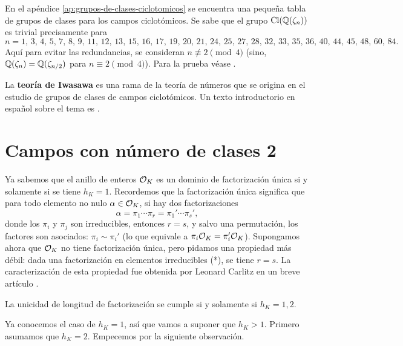 En el apéndice \ref{ap:grupos-de-clases-ciclotomicos} se encuentra una pequeña
tabla de grupos de clases para los campos ciclotómicos. Se sabe que el grupo
$\operatorname{Cl} (\mathbb{Q} (\zeta_n))$ es trivial precisamente para
$$n = 1, \, 3, \, 4, \, 5, \, 7, \, 8, \, 9, \, 11, \, 12, \, 13, \, 15, \, 16, \, 17, \, 19, \, 20, \, 21, \, 24, \, 25, \, 27, \, 28, \, 32, \, 33, \, 35, \, 36, \, 40, \, 44, \, 45, \, 48, \, 60, \, 84.$$
Aquí para evitar las redundancias, se consideran $n \not\equiv 2 \pmod{4}$
(sino, $\mathbb{Q} (\zeta_n) = \mathbb{Q} (\zeta_{n/2})$ para $n \equiv 2 \pmod{4}$).
Para la prueba véase \cite[Chapter 11]{Washington-GTM83}.

\vspace{1em}

La \textbf{teoría de Iwasawa} es una rama de la teoría de números que se origina
en el estudio de grupos de clases de campos ciclotómicos. Un texto introductorio
en español sobre el tema es \cite{Futterer-Villanueva}.


\section{Campos con número de clases 2}

Ya sabemos que el anillo de enteros $\mathcal{O}_K$ es un dominio de factorización única
si y solamente si se tiene ${h_K = 1}$. Recordemos que la factorización única
significa que para todo elemento no nulo $\alpha \in \mathcal{O}_K$, si hay dos
factorizaciones
\[ \tag{*} \alpha = \pi_1 \cdots \pi_r = \pi_1' \cdots \pi_s', \]
donde los $\pi_i$ y $\pi_j$ son irreducibles, entonces $r = s$, y salvo una
permutación, los factores son asociados: $\pi_i \sim \pi_i'$ (lo que equivale a
$\pi_i \mathcal{O}_K = \pi_i' \mathcal{O}_K$). Supongamos ahora que $\mathcal{O}_K$ no tiene factorización
única, pero pidamos una propiedad más débil: dada una factorización en
elementos irreducibles (*), se tiene $r = s$. La caracterización de esta
propiedad fue obtenida por Leonard Carlitz en un breve artículo
\cite{Carlitz-1960}.

\begin{teorema}
  La unicidad de longitud de factorización se cumple si y solamente si
  $h_K = 1,2$.
\end{teorema}

Ya conocemos el caso de $h_K = 1$, así que vamos a suponer que
$h_K > 1$. Primero asumamos que $h_K = 2$. Empecemos por la siguiente
observación.

